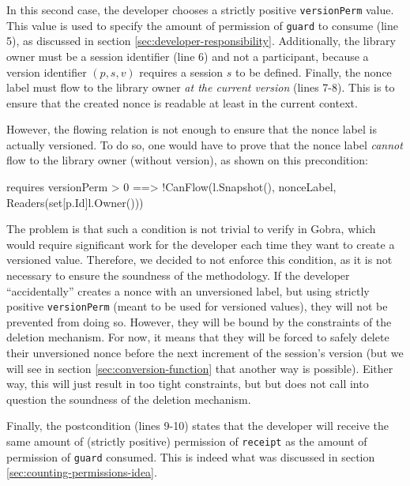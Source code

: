 In this second case, the developer chooses a strictly positive \texttt{versionPerm} value.
This value is used to specify the amount of permission of \texttt{guard} to consume (line 5), as discussed in section \ref{sec:developer-responsibility}.
Additionally, the library owner must be a session identifier (line 6) and not a participant, because a version identifier $(p,s,v)$ requires a session $s$ to be defined.
Finally, the nonce label must flow to the library owner \emph{at the current version} (lines 7-8).
This is to ensure that the created nonce is readable at least in the current context.

However, the flowing relation is not enough to ensure that the nonce label is actually versioned. To do so, one would have to prove that the nonce label \emph{cannot} flow to the library owner (without version), as shown on this precondition:

\begin{gobra}
requires versionPerm > 0 ==>
    !CanFlow(l.Snapshot(), nonceLabel, Readers(set[p.Id]{l.Owner()}))
\end{gobra}

The problem is that such a condition is not trivial to verify in Gobra, which would require significant work for the developer each time they want to create a versioned value.
Therefore, we decided to not enforce this condition, as it is not necessary to ensure the soundness of the methodology.
If the developer “accidentally” creates a nonce with an unversioned label, but using strictly positive \texttt{versionPerm} (meant to be used for versioned values), they will not be prevented from doing so.
However, they will be bound by the constraints of the deletion mechanism. For now, it means that they will be forced to safely delete their unversioned nonce before the next increment of the session's version (but we will see in section \ref{sec:conversion-function} that another way is possible).
Either way, this will just result in too tight constraints, but but does not call into question the soundness of the deletion mechanism.

Finally, the postcondition (lines 9-10) states that the developer will receive the same amount of (strictly positive) permission of \texttt{receipt} as the amount of permission of \texttt{guard} consumed. This is indeed what was discussed in section \ref{sec:counting-permissions-idea}.


